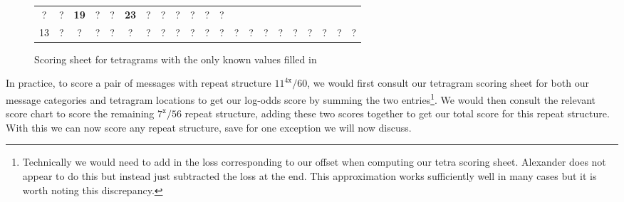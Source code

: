\begin{figure}[H]
\begin{center}
{\begin{tabular}{|c|*{20}{c|}}
				?             & ?              & {\bf{19}}    & ?             & ?
				              & {\bf{23}}      & ?            & ?             & ?
				              & ?              & ?            & ?                             \\
				13            & ?              & ?            & ?             & ?
				              & ?              & ?            & ?             & ?           &
				?             & ?              & ?            & ?             & ?
				              & ?              & ?            & ?             & ?
				              & ?              & ?            & ?                             \\
				\hline
			\end{tabular}}
	\end{center}
	\caption{Scoring sheet for tetragrams with the only known values filled in}
\end{figure}
\noindent In practice, to score a pair of messages with repeat structure
$11^{4\texttt{x}}/60$, we would first consult our tetragram scoring
sheet for both our message categories and tetragram locations to get our
log-odds score by summing the two entries\footnote{Technically we would need to add in the loss corresponding to our offset when computing our tetra scoring sheet. Alexander does not appear to do this but instead just subtracted the loss at the end. This approximation works sufficiently well in many cases but it is worth noting this discrepancy. }. We would then consult the relevant score chart to score
the remaining $7^\texttt{x}/56$ repeat structure, adding these two
scores together to get our total score for this repeat structure.
With this we can now score any repeat structure, save for one
exception we will now discuss.

